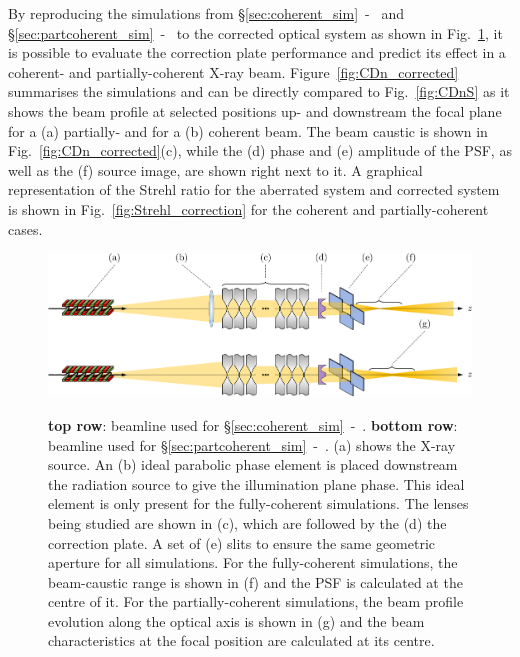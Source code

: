 \begin{refsection}
By reproducing the simulations from \S\ref{sec:coherent_sim}~-~\textit{} and \S\ref{sec:partcoherent_sim}~-~\textit{} to the corrected optical system as shown in Fig.~\ref{fig:optical_setups_corrected}, it is possible to evaluate the correction plate performance and predict its effect in a coherent- and partially-coherent X-ray beam. Figure~\ref{fig:CDn_corrected} summarises the simulations and can be directly compared to Fig.~\ref{fig:CDnS} as it
shows the beam profile at selected positions up- and downstream the focal plane for a (a) partially- and for a (b) coherent beam. The beam caustic is shown in Fig.~\ref{fig:CDn_corrected}(c), while the (d) phase and (e) amplitude of the PSF, as well as the (f) source image, are shown right next to it. A graphical representation of the Strehl ratio for the aberrated system and corrected system is shown in Fig.~\ref{fig:Strehl_correction} for the coherent and partially-coherent cases.

\begin{figure}[t]
        \centering
        {\includegraphics[width=0.8\linewidth]{figures/ch06/optical_setups_corrected.pdf}}
        \caption[Beamlines for coherent- and partially-coherent simulations]{\textbf{top row}: beamline used for  \S\ref{sec:coherent_sim}~-~\textit{}. \textbf{bottom row}: beamline used for  \S\ref{sec:partcoherent_sim}~-~\textit{}. (a) shows the X-ray source. An (b) ideal parabolic phase element is placed downstream the radiation source to give the illumination plane phase. This ideal element is only present for the fully-coherent simulations. The lenses being studied are shown in (c), which are followed by the (d) the correction plate. A set of (e) slits to ensure the same geometric aperture for all simulations. For the fully-coherent simulations, the beam-caustic range is shown in (f) and the PSF is calculated at the centre of it. For the partially-coherent simulations, the beam profile evolution along the optical axis is shown in (g) and the beam characteristics at the focal position are calculated at its centre. 
        }\label{fig:optical_setups_corrected}
\end{figure}


\end{refsection}
